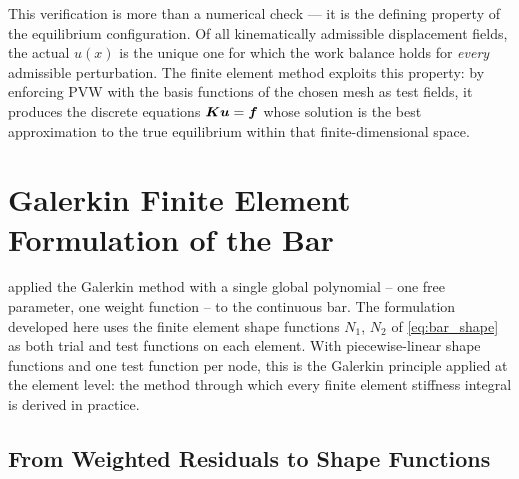 \begin{example}[Numerical verification of $\delta W_{\mathrm{int}} = \delta W_{\mathrm{ext}}$]
\begin{remark}
This verification is more than a numerical check — it is the defining property
of the equilibrium configuration. Of all kinematically admissible
displacement fields, the actual $u(x)$ is the unique one for which the work
balance holds for \emph{every} admissible perturbation. The finite element
method exploits this property: by enforcing PVW with the basis functions of
the chosen mesh as test fields, it produces the discrete equations
$\bm{K}\bm{u} = \bm{f}$ whose solution is the best approximation to the
true equilibrium within that finite-dimensional space.
\end{remark}

\end{example}

\section{Galerkin Finite Element Formulation of the Bar}
\label{sec:galerkin_fe}

\begin{remark}
 applied the Galerkin method with a single global
polynomial -- one free parameter, one weight function -- to the continuous bar.
The formulation developed here uses the finite element shape functions $N_1$,
$N_2$ of \cref{eq:bar_shape} as both trial and test functions on each element.
With piecewise-linear shape functions and one test function per node, this is
the Galerkin principle applied at the element level: the method through which
every finite element stiffness integral is derived in practice.
\end{remark}

\subsection{From Weighted Residuals to Shape Functions}
\label{sec:galerkin_fe_intro}

